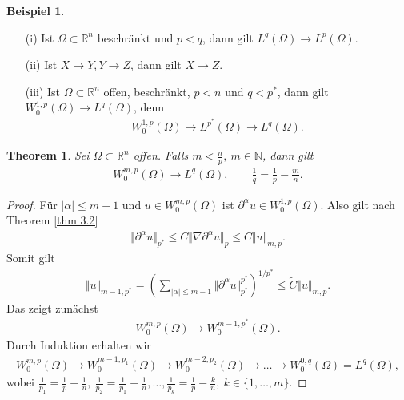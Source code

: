 \documentclass[
paper=a4,
bibtotocnumbered,
liststotocnumbered,
tablecaptionabove,
pointlessnumbers,
twoside,
openright,
10pt
]
{report}
\newtheorem{thm}{Theorem}[chapter]
\theoremstyle{definition}
\newtheorem*{bsp}{Beispiel}
\numberwithin{equation}{chapter}
\begin{document}
\begin{bsp}
\begin{enumerate}
\item[(i)] Ist $\Omega \subset \mathbb{R}^n$ beschränkt und $p<q$, dann gilt $L^q(\Omega) \rightarrow L^p(\Omega)$.
\item[(ii)] Ist $X \rightarrow Y, Y \rightarrow Z$, dann gilt $X \rightarrow Z$.
\item[(iii)] Ist $\Omega \subset \mathbb{R}^n$ offen,  beschränkt, $p<n$ und $q < p^*$, dann gilt $W_0^{1,p}(\Omega) \rightarrow L^q(\Omega)$, denn
\begin{align*}
W_0^{1,p}(\Omega) \rightarrow L^{p^*} (\Omega) \rightarrow L^q(\Omega).
\end{align*}
\end{enumerate} 
\end{bsp}
\begin{thm}\label{thm 3.3}
Sei $\Omega \subset \mathbb{R}^n$ offen. Falls $m < \frac{n}{p}, \ m \in \mathbb{N}$, dann gilt
\begin{align*}
W_0^{m,p}(\Omega) \rightarrow L^q(\Omega), \qquad \frac{1}{q} = \frac{1}{p} - \frac{m}{n}.
\end{align*}
\end{thm}
\begin{proof}
Für $|\alpha| \leq m-1$ und $u \in W_0^{m,p}(\Omega)$ ist $\partial^\alpha u \in W_0^{1,p}(\Omega)$. Also gilt nach Theorem \ref{thm 3.2} 
\begin{align*}
\Vert \partial^\alpha u \Vert_{p^*} \leq C \Vert  \nabla \partial^\alpha u \Vert_p \leq C \Vert  u \Vert_{m,p}.
\end{align*}
Somit gilt 
\begin{align*}
\Vert u \Vert_{m-1,p^*} = \left(\sum_{|\alpha| \leq m-1} \Vert \partial^\alpha u \Vert_{p^*}^{p^*}\right)^{1/p^*} \leq \widetilde{C} \Vert u \Vert_{m,p}.
\end{align*}
Das zeigt zunächst
\begin{align*}
W_0^{m,p}(\Omega) \rightarrow W_0^{m-1,p^*}(\Omega).
\end{align*}
Durch Induktion erhalten wir
\begin{align*}
W_0^{m,p}(\Omega) \rightarrow W_0^{m-1,p_1}(\Omega) \rightarrow W_0^{m-2,p_2}(\Omega) \rightarrow \ldots \rightarrow W_0^{0,q}(\Omega)=L^{q}(\Omega),
\end{align*}
wobei $\frac{1}{p_1}=\frac{1}{p}-\frac{1}{n} ,\ \frac{1}{p_2} = \frac{1}{p_1} - \frac{1}{n} , \ldots , \frac{1}{p_k} = \frac{1}{p} - \frac{k}{n},\ k \in \{1,\ldots,m\}.$
\end{proof}
\end{document}
